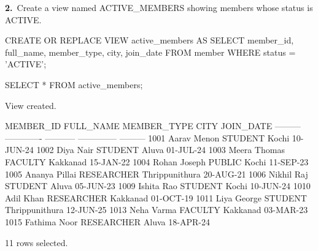 \noindent\begin{minipage}{\linewidth}
\begingroup{}
{\fontsize{14}{17}\selectfont\textbf{2.}}\ Create a view named ACTIVE\_MEMBERS showing members whose status is ACTIVE.\par
\endgroup\vspace{12pt}


\begin{sqlcode}
CREATE OR REPLACE VIEW active_members AS
SELECT member_id, full_name, member_type, city, join_date
FROM member
WHERE status = 'ACTIVE';

SELECT * FROM active_members;
\end{sqlcode}

\vspace{18pt}


\begin{sqlout}[fontsize=\small]
View created.

MEMBER_ID  FULL_NAME      MEMBER_TYPE  CITY            JOIN_DATE
---------  -------------  -----------  --------------  ---------
     1001  Aarav Menon    STUDENT      Kochi           10-JUN-24
     1002  Diya Nair      STUDENT      Aluva           01-JUL-24
     1003  Meera Thomas   FACULTY      Kakkanad        15-JAN-22
     1004  Rohan Joseph   PUBLIC       Kochi           11-SEP-23
     1005  Ananya Pillai  RESEARCHER   Thrippunithura  20-AUG-21
     1006  Nikhil Raj     STUDENT      Aluva           05-JUN-23
     1009  Ishita Rao     STUDENT      Kochi           10-JUN-24
     1010  Adil Khan      RESEARCHER   Kakkanad        01-OCT-19
     1011  Liya George    STUDENT      Thrippunithura  12-JUN-25
     1013  Neha Varma     FACULTY      Kakkanad        03-MAR-23
     1015  Fathima Noor   RESEARCHER   Aluva           18-APR-24

11 rows selected.
\end{sqlout}
\end{minipage}\par\vspace{24pt}

